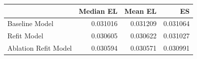\begin{tabular}{lrrr}
\toprule
 & Median EL & Mean EL & ES \\
\midrule
Baseline Model & 0.031016 & 0.031209 & 0.031064 \\
Refit Model & 0.030605 & 0.030622 & 0.031027 \\
Ablation Refit Model & 0.030594 & 0.030571 & 0.030991 \\
\bottomrule
\end{tabular}
